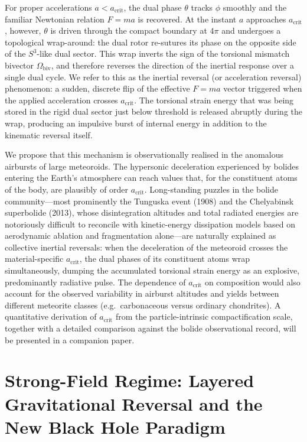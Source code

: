 \documentclass[dvipdfmx,a4paper]{article}
\begin{document}
For proper accelerations $a < a_\text{crit}$, the dual phase $\theta$ tracks $\phi$ smoothly and the familiar Newtonian relation $F = ma$ is recovered. At the instant $a$ approaches $a_\text{crit}$, however, $\theta$ is driven through the compact boundary at $4\pi$ and undergoes a topological wrap-around: the dual rotor re-sutures its phase on the opposite side of the $S^3$-like dual sector. This wrap inverts the sign of the torsional mismatch bivector $\Omega_\text{biv}$, and therefore reverses the direction of the inertial response over a single dual cycle. We refer to this as the inertial reversal (or acceleration reversal) phenomenon: a sudden, discrete flip of the effective $F = ma$ vector triggered when the applied acceleration crosses $a_\text{crit}$. The torsional strain energy that was being stored in the rigid dual sector just below threshold is released abruptly during the wrap, producing an impulsive burst of internal energy in addition to the kinematic reversal itself.

We propose that this mechanism is observationally realised in the anomalous airbursts of large meteoroids. The hypersonic deceleration experienced by bolides entering the Earth's atmosphere can reach values that, for the constituent atoms of the body, are plausibly of order $a_\text{crit}$. Long-standing puzzles in the bolide community---most prominently the Tunguska event (1908) and the Chelyabinsk superbolide (2013), whose disintegration altitudes and total radiated energies are notoriously difficult to reconcile with kinetic-energy dissipation models based on aerodynamic ablation and fragmentation alone---are naturally explained as collective inertial reversals: when the deceleration of the meteoroid crosses the material-specific $a_\text{crit}$, the dual phases of its constituent atoms wrap simultaneously, dumping the accumulated torsional strain energy as an explosive, predominantly radiative pulse. The dependence of $a_\text{crit}$ on composition would also account for the observed variability in airburst altitudes and yields between different meteorite classes (e.g.\ carbonaceous versus ordinary chondrites). A quantitative derivation of $a_\text{crit}$ from the particle-intrinsic compactification scale, together with a detailed comparison against the bolide observational record, will be presented in a companion paper.

\section{Strong-Field Regime: Layered Gravitational Reversal and the New Black Hole Paradigm}
\label{sec:strongfield}
\end{document}
